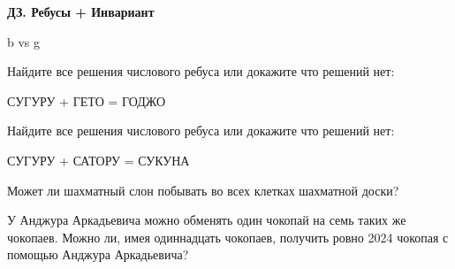 \centerline{\bf \Huge ДЗ. Ребусы + Инвариант}
\centerline{\bf \Huge }


\begin{flushright}
        \scriptsize{b vs g}
\end{flushright}


 Найдите все решения числового ребуса или докажите что решений нет:

СУГУРУ + ГЕТО = ГОДЖО

 Найдите все решения числового ребуса или докажите что решений нет:

СУГУРУ + САТОРУ = СУКУНА

 Может ли шахматный слон побывать во всех клетках шахматной доски?

 У Анджура Аркадьевича можно обменять один чокопай на семь таких же чокопаев. Можно ли, имея одиннадцать чокопаев, получить ровно 2024 чокопая с помощью Анджура Аркадьевича?